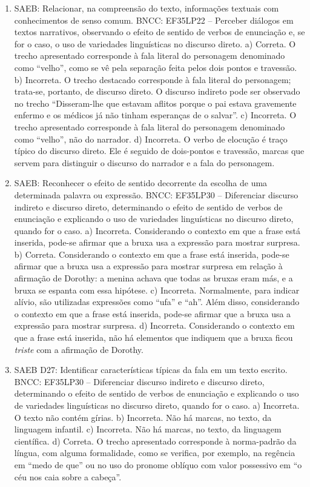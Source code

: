 
\begin{enumerate}
\item
SAEB: Relacionar, na compreensão do texto, informações textuais com
conhecimentos de senso comum.
BNCC: EF35LP22 -- Perceber diálogos em textos narrativos, observando o
efeito de sentido de verbos de enunciação e, se for o caso, o uso de
variedades linguísticas no discurso direto.
a) Correta. O trecho apresentado corresponde à fala literal do personagem
denominado como ``velho'', como se vê pela separação feita pelos dois
pontos e travessão.
b) Incorreta. O trecho destacado corresponde à fala literal do personagem; 
trata-se, portanto, de discurso direto. O discurso indireto
pode ser observado no trecho ``Disseram-lhe que estavam aflitos
porque o pai estava gravemente enfermo e os médicos já não tinham
esperanças de o salvar''.
c) Incorreta. O trecho apresentado corresponde à fala literal do personagem
denominado como ``velho'', não do narrador.  
d) Incorreta. O verbo de elocução é traço típico do discurso direto. Ele é
seguido de dois-pontos e travessão, marcas que servem para distinguir o 
discurso do narrador e a fala do personagem.

\item
SAEB: Reconhecer o efeito
de sentido decorrente da escolha de uma determinada palavra ou
expressão.
BNCC: EF35LP30 -- Diferenciar discurso indireto e discurso direto,
determinando o efeito de sentido de verbos de enunciação e explicando o
uso de variedades linguísticas no discurso direto, quando for o caso.
a) Incorreta. Considerando o contexto em que a frase está inserida, 
pode-se afirmar que a bruxa usa a expressão para mostrar surpresa.
b) Correta. Considerando o contexto em que a frase está inserida, 
pode-se afirmar que a bruxa usa a expressão para mostrar surpresa em 
relação à afirmação de Dorothy: a menina achava que todas as bruxas eram
más, e a bruxa se espanta com essa hipótese.
c)  Incorreta. Normalmente, para indicar alívio, são utilizadas
expressões como ``ufa'' e ``ah''. Além disso, considerando o contexto em
que a frase está inserida, pode-se afirmar que a bruxa usa a expressão 
para mostrar surpresa.
d)  Incorreta. Considerando o contexto em que a frase está inserida, 
não há elementos que indiquem que a bruxa ficou \textit{triste} com a 
afirmação de Dorothy.

\item
SAEB D27: Identificar características típicas da fala em um texto
escrito.
BNCC: EF35LP30 -- Diferenciar discurso indireto e discurso direto,
determinando o efeito de sentido de verbos de enunciação e explicando o
uso de variedades linguísticas no discurso direto, quando for o caso.
a)  Incorreta. O texto não contém gírias.
b)  Incorreta. Não há marcas, no texto, da linguagem infantil.
c)  Incorreta. Não há marcas, no texto, da linguagem científica.
d)  Correta. O trecho apresentado corresponde à norma-padrão da língua, 
com alguma formalidade, como se verifica, por exemplo, na regência em
``medo de que'' ou no uso do pronome oblíquo com valor possessivo em 
``o céu nos caia sobre a cabeça''.
\end{enumerate}

